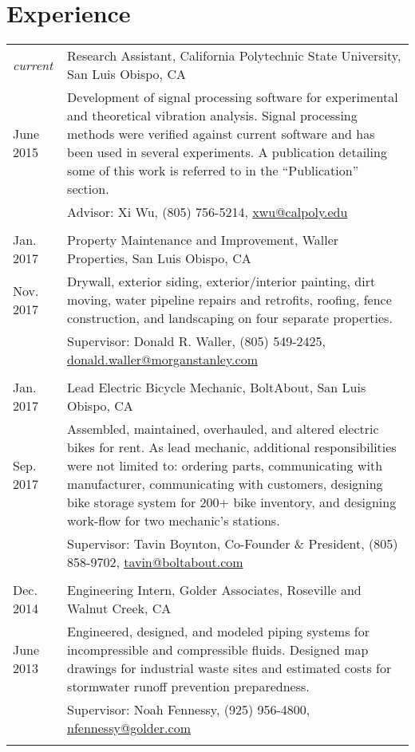 \documentclass[10pt]{article} %
\newcommand{\catspace}{-.4em}
\begin{document}
\section{Experience}

	\begin{tabular}{p{.6in}|p{5.5in}}
		\emph{current}& Research Assistant, California Polytechnic State University, San Luis Obispo, CA \\
		June 2015& \footnotesize{Development of signal processing software for experimental and theoretical vibration analysis. Signal processing methods were verified against current software and has been used in several experiments. A publication detailing some of this work is referred to in the ``Publication'' section.}\\
		&\footnotesize{\hfill Advisor: Xi Wu, (805) 756-5214, \href{mailto:xwu@calpoly.edu}{xwu@calpoly.edu}}\\
		\multicolumn{2}{c}{} \\	[\catspace]	
		
		Jan. 2017& Property Maintenance and Improvement, Waller Properties, San Luis Obispo, CA\\
		Nov. 2017& \footnotesize{Drywall, exterior siding, exterior/interior painting, dirt moving, water pipeline repairs and retrofits, roofing, fence construction, and landscaping on four separate properties.}\\[.5em]
		&\footnotesize{ \hfill Supervisor: Donald R. Waller, (805) 549-2425, \href{mailto:donald.waller@morganstanley.com}{donald.waller@morganstanley.com}}\\
		\multicolumn{2}{c}{} \\[\catspace]
		Jan. 2017& Lead Electric Bicycle Mechanic, BoltAbout, San Luis Obispo, CA\\
		Sep. 2017& \footnotesize{Assembled, maintained, overhauled, and altered electric bikes for rent. As lead mechanic, additional responsibilities were not limited to: ordering parts, communicating with manufacturer, communicating with customers, designing bike storage system for 200+ bike inventory, and designing work-flow for two mechanic's stations.}\\[.5em]
		& \footnotesize{\hfill Supervisor: Tavin Boynton, Co-Founder \& President, (805) 858-9702, \href{mailto:tavin@boltabout.com}{tavin@boltabout.com}}\\
		\multicolumn{2}{c}{} \\[\catspace]
		
		Dec. 2014& Engineering Intern, Golder Associates, Roseville and Walnut Creek, CA \\
		June 2013&\footnotesize{Engineered, designed, and modeled piping systems for incompressible and compressible fluids. Designed map drawings for industrial waste sites and estimated costs for stormwater runoff prevention preparedness.}\\[.5em]
		&\footnotesize{\hfill Supervisor: Noah Fennessy, (925) 956-4800, \href{nfennessy@golder.com}{nfennessy@golder.com}}\\
		\multicolumn{2}{c}{} \\	[\catspace]	
		

\end{tabular}
\end{document}
